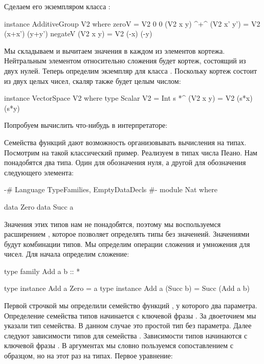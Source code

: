 Сделаем его экземпляром класса :


\begin{code}
instance AdditiveGroup V2 where
    zeroV       = V2 0 0
    (V2 x y)  ^+^ (V2 x' y')  = V2 (x+x') (y+y')
    negateV (V2 x y)   = V2 (-x) (-y)
\end{code}

Мы складываем и вычитаем значения в каждом из элементов кортежа.
Нейтральным элементом относительно сложения будет кортеж, состоящий из
двух нулей. Теперь определим экземпляр для класса .
Поскольку кортеж состоит из двух целых чисел, скаляр также будет целым
числом:


\begin{code}
instance VectorSpace V2 where
    type Scalar V2 = Int
    s *^ (V2 x y) = V2 (s*x) (s*y)
\end{code}

Попробуем вычислить что-нибудь в интерпретаторе:



Семейства функций дают возможность организовывать вычисления на типах.
Посмотрим на такой классический пример. Реализуем в типах числа Пеано.
Нам понадобятся два типа. Один для обозначения нуля, а другой для
обозначения следующего элемента:


\begin{code}
{-# Language TypeFamilies, EmptyDataDecls #-}
module Nat where

data Zero
data Succ a
\end{code}

Значения этих типов нам не понадобятся, поэтому мы воспользуемся
расширением , которое позволяет определять типы без
значенеий. Значениями будут комбинации типов. Мы определим операции
сложения и умножения для чисел. Для начала определим сложение:


\begin{code}
type family Add a b :: *

type instance Add a Zero        = a
type instance Add a (Succ b)    = Succ (Add a b)
\end{code}

Первой строчкой мы определили семейство функций , у которого два
параметра. Определение семейства типов начинается с ключевой фразы
 . За двоеточием мы указали тип
семейства. В данном случае это простой тип без параметра. Далее следуют
зависимости типов для семейства . Зависимости типов начинаются с
ключевой фразы  . В аргументах
мы словно пользуемся сопоставлением с образцом, но на этот раз на типах.
Первое уравнение:


